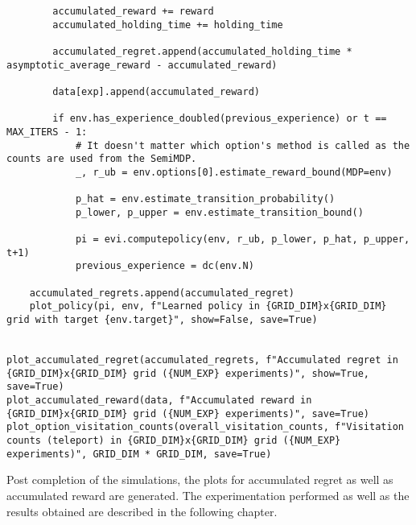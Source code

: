 \begin{verbatim}
        accumulated_reward += reward
        accumulated_holding_time += holding_time

        accumulated_regret.append(accumulated_holding_time * asymptotic_average_reward - accumulated_reward)

        data[exp].append(accumulated_reward)

        if env.has_experience_doubled(previous_experience) or t == MAX_ITERS - 1:
            # It doesn't matter which option's method is called as the counts are used from the SemiMDP.
            _, r_ub = env.options[0].estimate_reward_bound(MDP=env)

            p_hat = env.estimate_transition_probability()
            p_lower, p_upper = env.estimate_transition_bound()

            pi = evi.computepolicy(env, r_ub, p_lower, p_hat, p_upper, t+1)
            previous_experience = dc(env.N)

    accumulated_regrets.append(accumulated_regret)
    plot_policy(pi, env, f"Learned policy in {GRID_DIM}x{GRID_DIM} grid with target {env.target}", show=False, save=True)


plot_accumulated_regret(accumulated_regrets, f"Accumulated regret in {GRID_DIM}x{GRID_DIM} grid ({NUM_EXP} experiments)", show=True, save=True)
plot_accumulated_reward(data, f"Accumulated reward in {GRID_DIM}x{GRID_DIM} grid ({NUM_EXP} experiments)", save=True)
plot_option_visitation_counts(overall_visitation_counts, f"Visitation counts (teleport) in {GRID_DIM}x{GRID_DIM} grid ({NUM_EXP} experiments)", GRID_DIM * GRID_DIM, save=True)
\end{verbatim}

Post completion of the simulations, the plots for accumulated regret as well as accumulated reward are generated.
The experimentation performed as well as the results obtained are described in the following chapter.
